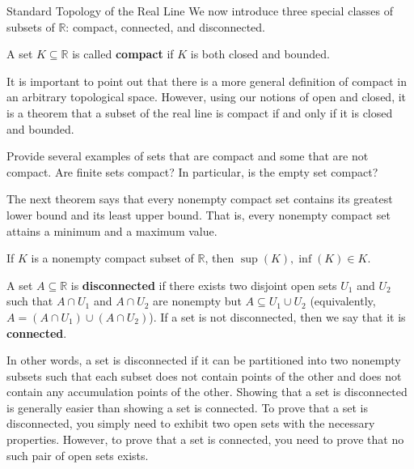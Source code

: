 \begin{section}{Standard Topology of the Real Line}
We now introduce three special classes of subsets of $\mathbb{R}$: compact, connected, and disconnected. 

\begin{definition}
A set $K\subseteq\mathbb{R}$ is called \textbf{compact} if $K$ is both closed and bounded.
\end{definition}

It is important to point out that there is a more general definition of compact in an arbitrary topological space.  However, using our notions of open and closed, it is a theorem that a subset of the real line is compact if and only if it is closed and bounded.

\begin{problem}
Provide several examples of sets that are compact and some that are not compact. Are finite sets compact? In particular, is the empty set compact?
\end{problem}

The next theorem says that every nonempty compact set contains its greatest lower bound and its least upper bound. That is, every nonempty compact set attains a minimum and a maximum value.

\begin{theorem}
If $K$ is a nonempty compact subset of $\mathbb{R}$, then $\sup(K),\inf(K)\in K$.
\end{theorem}

\begin{definition}
A set $A\subseteq \mathbb{R}$ is \textbf{disconnected} if there exists two disjoint open sets $U_1$ and $U_2$ such that $A\cap U_1$ and $A\cap U_2$ are nonempty but $A\subseteq U_1\cup U_2$ (equivalently, $A=(A\cap U_1)\cup(A\cap U_2)$). If a set is not disconnected, then we say that it is \textbf{connected}.
\end{definition}

In other words, a set is disconnected if it can be partitioned into two nonempty subsets such that each subset does not contain points of the other and does not contain any accumulation points of the other. Showing that a set is disconnected is generally easier than showing a set is connected. To prove that a set is disconnected, you simply need to exhibit two open sets with the necessary properties. However, to prove that a set is connected, you need to prove that no such pair of open sets exists.


\end{section}
